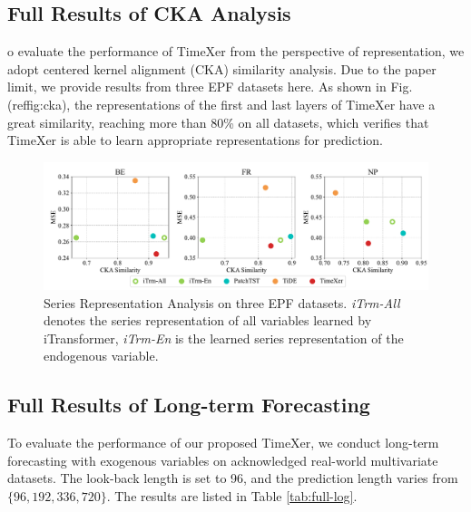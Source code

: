 \documentclass[nohyperref]{article}
\theoremstyle{plain}
\theoremstyle{definition}
\theoremstyle{remark}
\begin{document}
\subsection{Full Results of CKA Analysis}
o evaluate the performance of TimeXer from the perspective of representation, we adopt centered kernel alignment (CKA) similarity \cite{kornblith2019similarity} analysis. Due to the paper limit,  we provide results from three EPF datasets here.
As shown in Fig. (ref{fig:cka}), the representations of the first and last layers of TimeXer have a great similarity, reaching more than 80\% on all datasets, which verifies that TimeXer is able to learn appropriate representations for prediction.

\begin{figure}[h]
    \centering
    \includegraphics[width=\linewidth]{fig/cka_3.pdf}
    \caption{Series Representation Analysis on three EPF datasets. \emph{iTrm-All} denotes the series representation of all variables learned by iTransformer, \emph{iTrm-En} is the learned series representation of the endogenous variable.}
    \label{fig:full-cka}
\end{figure}


\subsection{Full Results of Long-term Forecasting}
To evaluate the performance of our proposed TimeXer, we conduct long-term forecasting with exogenous variables on acknowledged real-world multivariate datasets. The look-back length is set to 96, and the prediction length varies from $\{96, 192, 336, 720\}$. The results are listed in Table \ref{tab:full-log}.
\end{document}
